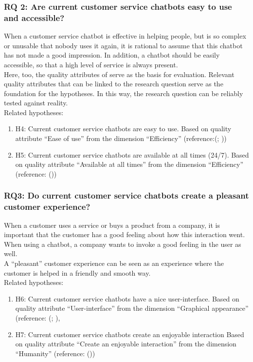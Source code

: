 \subsubsection{RQ 2: Are current customer service chatbots easy to use and accessible?}
When a customer service chatbot is effective in helping people, but is so complex or unusable that nobody uses it again, it is rational to assume that this chatbot has not made a good impression. In addition, a chatbot should be easily accessible, so that a high level of service is always present.\\
Here, too, the quality attributes of \cite{Verkeyn2018} serve as the basis for evaluation. Relevant quality attributes that can be linked to the research question serve as the foundation for the hypotheses. In this way, the research question can be reliably tested against reality.\\
\break
\break
Related hypotheses:
\begin{enumerate}
	\item H4: Current customer service chatbots are easy to use. Based on \cite{Verkeyn2018} quality attribute “Ease of use” from the dimension “Efficiency” (reference:(\cite{Candela2018}; \cite{Duijst2017}))
	\item H5: Current customer service chatbots are available at all times (24/7). Based on \cite{Verkeyn2018} quality attribute “Available at all times” from the dimension “Efficiency” (reference: (\cite{Wang2019}))
\end{enumerate}

\subsubsection{RQ3: Do current customer service chatbots create a pleasant customer experience?}
When a customer uses a service or buys a product from a company, it is important that the customer has a good feeling about how this interaction went. When using a chatbot, a company wants to invoke a good feeling in the user as well. \\
\break
A “pleasant” customer experience can be seen as an experience where the customer is helped in a friendly and smooth way.\\
\break
\break
Related hypotheses:
\begin{enumerate}
	\item H6: Current customer service chatbots have a nice user-interface. Based on \cite{Verkeyn2018} quality attribute “User-interface” from the dimension “Graphical appearance” (reference: (\cite{Duijst2017}; \cite{Kuligowska2015}),
	\item H7: Current customer service chatbots create an enjoyable interaction Based on \cite{Verkeyn2018} quality attribute “Create an enjoyable interaction” from the dimension “Humanity” (reference: (\cite{Morrissey2013}))
\end{enumerate}

